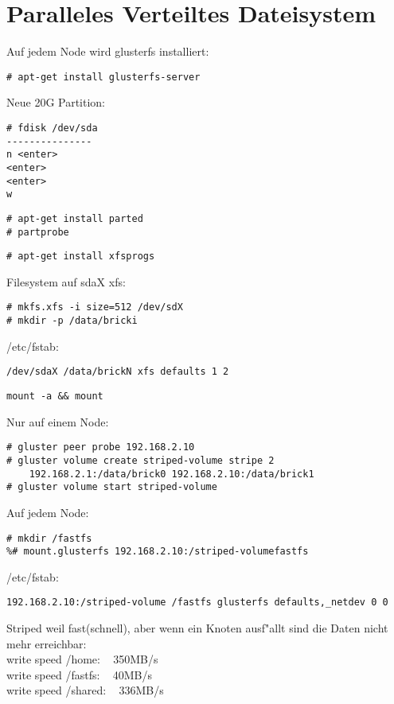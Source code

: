 \section{Paralleles Verteiltes Dateisystem}
Auf jedem Node wird glusterfs installiert:
\begin{lstlisting}[style=Bash]
# apt-get install glusterfs-server
\end{lstlisting}
Neue 20G Partition:
\begin{lstlisting}[style=Bash]
# fdisk /dev/sda
---------------
n <enter>
<enter>
<enter>
w
\end{lstlisting}
\begin{lstlisting}[style=Bash]
# apt-get install parted
# partprobe
\end{lstlisting}
\begin{lstlisting}[style=Bash]
# apt-get install xfsprogs
\end{lstlisting}
Filesystem auf sdaX xfs:
\begin{lstlisting}[style=Bash]
# mkfs.xfs -i size=512 /dev/sdX
# mkdir -p /data/bricki
\end{lstlisting}
/etc/fstab:
\begin{lstlisting}[style=Bash]
/dev/sdaX /data/brickN xfs defaults 1 2
\end{lstlisting}
\begin{lstlisting}[style=Bash]
mount -a && mount
\end{lstlisting}
Nur auf einem Node:
\begin{lstlisting}[style=Bash]
# gluster peer probe 192.168.2.10
# gluster volume create striped-volume stripe 2 
    192.168.2.1:/data/brick0 192.168.2.10:/data/brick1
# gluster volume start striped-volume
\end{lstlisting}
Auf jedem Node:
\begin{lstlisting}[style=Bash]
# mkdir /fastfs 
%# mount.glusterfs 192.168.2.10:/striped-volumefastfs
\end{lstlisting}
/etc/fstab:
\begin{lstlisting}[style=Bash]
192.168.2.10:/striped-volume /fastfs glusterfs defaults,_netdev 0 0
\end{lstlisting}
Striped weil fast(schnell), aber wenn ein Knoten ausf"allt sind die Daten nicht mehr erreichbar:\\
write speed /home: ~ 350MB/s\\
write speed /fastfs: ~ 40MB/s\\
write speed /shared: ~ 336MB/s\\
